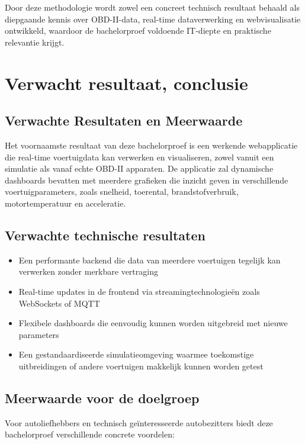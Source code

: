 Door deze methodologie wordt zowel een concreet technisch resultaat behaald als diepgaande kennis over OBD-II-data, real-time dataverwerking en webvisualisatie ontwikkeld, waardoor de bachelorproef voldoende IT-diepte en praktische relevantie krijgt.

\section{Verwacht resultaat, conclusie}%
\label{sec:verwachte_resultaten}

\subsection{Verwachte Resultaten en Meerwaarde}
Het voornaamste resultaat van deze bachelorproef is een werkende webapplicatie die real-time voertuigdata kan verwerken en visualiseren, zowel vanuit een simulatie als vanaf echte OBD-II apparaten. De applicatie zal dynamische dashboards bevatten met meerdere grafieken die inzicht geven in verschillende voertuigparameters, zoals snelheid, toerental, brandstofverbruik, motortemperatuur en acceleratie.

\subsection{Verwachte technische resultaten}

\begin{itemize}
    \item Een performante backend die data van meerdere voertuigen tegelijk kan verwerken zonder merkbare vertraging
    \item Real-time updates in de frontend via streamingtechnologieën zoals WebSockets of MQTT
    \item Flexibele dashboards die eenvoudig kunnen worden uitgebreid met nieuwe parameters
    \item Een gestandaardiseerde simulatieomgeving waarmee toekomstige uitbreidingen of andere voertuigen makkelijk kunnen worden getest
\end{itemize}


\subsection{Meerwaarde voor de doelgroep}
Voor autoliefhebbers en technisch geïnteresseerde autobezitters biedt deze bachelorproef verschillende concrete voordelen:

